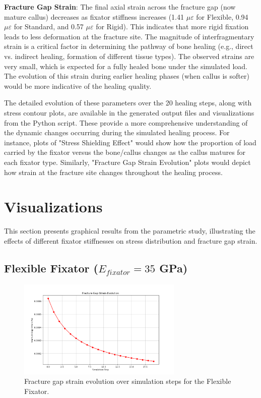 \documentclass{article}
\begin{document}
\textbf{Fracture Gap Strain}:
The final axial strain across the fracture gap (now mature callus) decreases as fixator stiffness increases (1.41 $\mu\varepsilon$ for Flexible, 0.94 $\mu\varepsilon$ for Standard, and 0.57 $\mu\varepsilon$ for Rigid). This indicates that more rigid fixation leads to less deformation at the fracture site. The magnitude of interfragmentary strain is a critical factor in determining the pathway of bone healing (e.g., direct vs. indirect healing, formation of different tissue types). The observed strains are very small, which is expected for a fully healed bone under the simulated load. The evolution of this strain during earlier healing phases (when callus is softer) would be more indicative of the healing quality.

The detailed evolution of these parameters over the 20 healing steps, along with stress contour plots, are available in the generated output files and visualizations from the Python script. These provide a more comprehensive understanding of the dynamic changes occurring during the simulated healing process. For instance, plots of "Stress Shielding Effect" would show how the proportion of load carried by the fixator versus the bone/callus changes as the callus matures for each fixator type. Similarly, "Fracture Gap Strain Evolution" plots would depict how strain at the fracture site changes throughout the healing process.

\section{Visualizations}
\label{sec:visualizations}

This section presents graphical results from the parametric study, illustrating the effects of different fixator stiffnesses on stress distribution and fracture gap strain.

\subsection{Flexible Fixator (\texorpdfstring{$E_{fixator} = 35$}{E\_fixator = 35} GPa)}

\begin{figure}[htbp]
  \centering
  \includegraphics[width=0.7\textwidth]{../output_advanced/Flexible/gap_strain.png}
  \caption{Fracture gap strain evolution over simulation steps for the Flexible Fixator.}
  \label{fig:flexible_gap_strain}
\end{figure}
\end{document}
